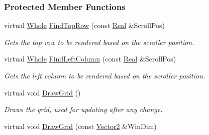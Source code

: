 \subsubsection*{Protected Member Functions}
\begin{DoxyCompactItemize}
\item 
\hypertarget{classphys_1_1UI_1_1ScrolledCellGrid_a39fd3d566131310f4a2e5713216e7ef2}{
virtual \hyperlink{namespacephys_a460f6bc24c8dd347b05e0366ae34f34a}{Whole} \hyperlink{classphys_1_1UI_1_1ScrolledCellGrid_a39fd3d566131310f4a2e5713216e7ef2}{FindTopRow} (const \hyperlink{namespacephys_af7eb897198d265b8e868f45240230d5f}{Real} \&ScrollPos)}
\label{d5/db4/classphys_1_1UI_1_1ScrolledCellGrid_a39fd3d566131310f4a2e5713216e7ef2}

\begin{DoxyCompactList}\small\item\em Gets the top row to be rendered based on the scroller position. \item\end{DoxyCompactList}\item 
\hypertarget{classphys_1_1UI_1_1ScrolledCellGrid_abe9fe1c56866ecc796f5b2ea8f72b853}{
virtual \hyperlink{namespacephys_a460f6bc24c8dd347b05e0366ae34f34a}{Whole} \hyperlink{classphys_1_1UI_1_1ScrolledCellGrid_abe9fe1c56866ecc796f5b2ea8f72b853}{FindLeftColumn} (const \hyperlink{namespacephys_af7eb897198d265b8e868f45240230d5f}{Real} \&ScrollPos)}
\label{d5/db4/classphys_1_1UI_1_1ScrolledCellGrid_abe9fe1c56866ecc796f5b2ea8f72b853}

\begin{DoxyCompactList}\small\item\em Gets the left column to be rendered based on the scroller position. \item\end{DoxyCompactList}\item 
\hypertarget{classphys_1_1UI_1_1ScrolledCellGrid_aab9b6520eefbc712c9577ae0db121f13}{
virtual void \hyperlink{classphys_1_1UI_1_1ScrolledCellGrid_aab9b6520eefbc712c9577ae0db121f13}{DrawGrid} ()}
\label{d5/db4/classphys_1_1UI_1_1ScrolledCellGrid_aab9b6520eefbc712c9577ae0db121f13}

\begin{DoxyCompactList}\small\item\em Draws the grid, used for updating after any change. \item\end{DoxyCompactList}\item 
\hypertarget{classphys_1_1UI_1_1ScrolledCellGrid_a2931912dae2aabe0dcfd3a30f9ad8634}{
virtual void \hyperlink{classphys_1_1UI_1_1ScrolledCellGrid_a2931912dae2aabe0dcfd3a30f9ad8634}{DrawGrid} (const \hyperlink{classphys_1_1Vector2}{Vector2} \&WinDim)}
\label{d5/db4/classphys_1_1UI_1_1ScrolledCellGrid_a2931912dae2aabe0dcfd3a30f9ad8634}


\end{DoxyCompactItemize}
